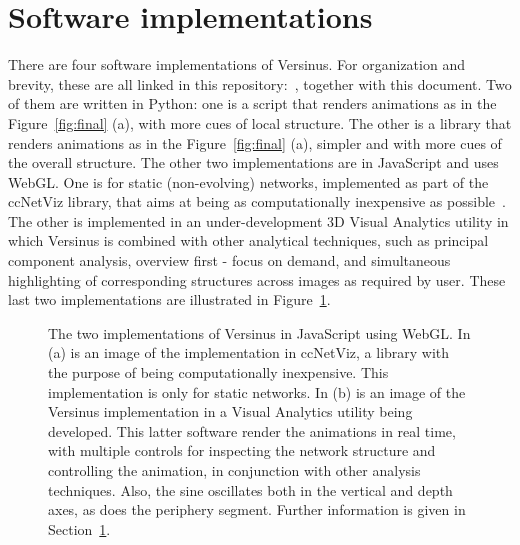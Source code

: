 \documentclass[runningheads]{llncs}
\begin{document}
\section{Software implementations}\label{sec:imp}
There are four software implementations of Versinus.
For organization and brevity, these are all linked in this repository:~\cite{verRepo}, together with this document.
Two of them are written in Python: one is a script that renders animations as in the Figure~\ref{fig:final} (a), with more cues of local structure. The other is a library that renders animations as in the Figure~\ref{fig:final} (a), simpler and with more cues of the overall structure.
The other two implementations are in JavaScript and uses WebGL. One is for static (non-evolving) networks, implemented as part of the ccNetViz library, that aims at being as computationally inexpensive as possible~\cite{cell}. The other is implemented in an under-development 3D Visual Analytics utility in which Versinus is combined with other analytical techniques, such as principal component analysis, overview first - focus on demand, and simultaneous highlighting of corresponding structures across images as required by user.
These last two implementations are illustrated in Figure~\ref{fig:extra}.

\begin{figure}[!h]\centering
    \qquad
    \caption{The two implementations of Versinus in JavaScript using WebGL. In (a) is an image of the implementation in ccNetViz, a library with the purpose of being computationally inexpensive. This implementation is only for static networks. In (b) is an image of the Versinus implementation in a Visual Analytics utility being developed. This latter software render the animations in real time, with multiple controls for inspecting the network structure and controlling the animation, in conjunction with other analysis techniques. Also, the sine oscillates both in the vertical and depth axes, as does the periphery segment. Further information is given in Section~\ref{sec:imp}.}
    \label{fig:extra}
\end{figure}
\end{document}
